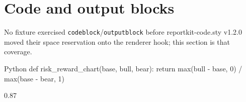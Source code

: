 \documentclass{reportkit}
\begin{document}
\section{Code and output blocks}
No fixture exercised \texttt{codeblock}/\texttt{outputblock} before reportkit-code.sty
v1.2.0 moved their space reservation onto the \texttt{\string\RKReserveSpace} renderer
hook; this section is that coverage.

\begin{codeblock}[figures.py]{Python}
def risk_reward_chart(base, bull, bear):
    return max(bull - base, 0) / max(base - bear, 1)
\end{codeblock}

\begin{outputblock}
0.87
\end{outputblock}
\end{document}
